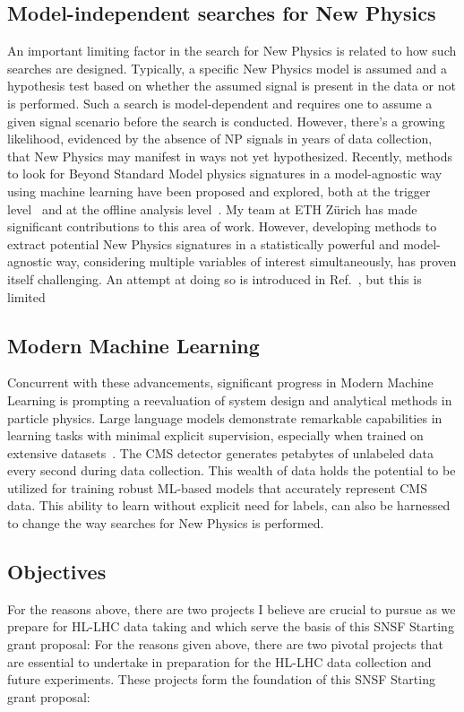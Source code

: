 \documentclass[12pt]{iopart}
\begin{document}
\subsection{Model-independent searches for New Physics}
An important limiting factor in the search for New Physics is related to how such searches are designed. Typically, a specific New Physics model is assumed and a hypothesis test based on whether the assumed signal is present in the data or not is performed. Such a search is model-dependent and requires one to assume a given signal scenario before the search is conducted. However, there's a growing likelihood, evidenced by the absence of NP signals in years of data collection, that New Physics may manifest in ways not yet hypothesized. Recently, methods to look for Beyond Standard Model physics signatures in a model-agnostic way using machine learning have been proposed and explored, both at the trigger level~\cite{CMS-DP-2023-079,BELIS2024100091} and at the offline analysis level~\cite{Harris:2881089,BELIS2024100091}. My team at ETH Zürich has made significant contributions to this area of work. However, developing methods to extract potential New Physics signatures in a statistically powerful and model-agnostic way, considering multiple variables of interest simultaneously, has proven itself challenging. An attempt at doing so is introduced in Ref.~\cite{D_Agnolo_2019}, but this is limited

\subsection{Modern Machine Learning}
Concurrent with these advancements, significant progress in Modern Machine Learning is prompting a reevaluation of system design and analytical methods in particle physics. Large language models demonstrate remarkable capabilities in learning tasks with minimal explicit supervision, especially when trained on extensive datasets~\cite{Radford2019LanguageMA,brown2020language}. The CMS detector generates petabytes of unlabeled data every second during data collection. This wealth of data holds the potential to be utilized for training robust ML-based models that accurately represent CMS data. This ability to learn without explicit need for labels, can also be harnessed to change the way searches for New Physics is performed.

\subsection{Objectives}
For the reasons above, there are two projects I believe are crucial to pursue as we prepare for HL-LHC data taking and which serve the basis of this SNSF Starting grant proposal:
For the reasons given above, there are two pivotal projects that are essential to undertake in preparation for the HL-LHC data collection and future experiments. These projects form the foundation of this SNSF Starting grant proposal:
\end{document}
